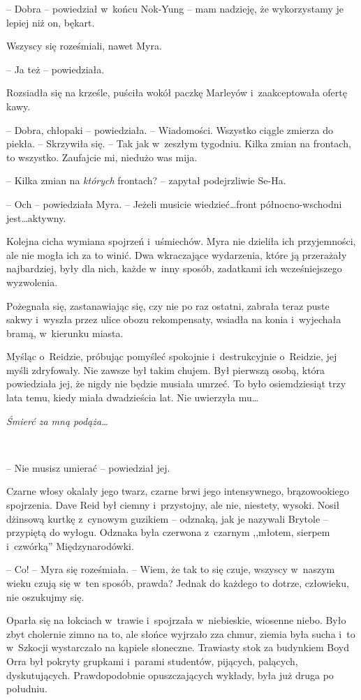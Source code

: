 \documentclass[oneside,polish,11pt,sfheadings]{mwbk}
\begin{document}
-- Dobra -- powiedział w~końcu Nok-Yung -- mam nadzieję, że wykorzystamy je
lepiej niż on, bękart.

Wszyscy się roześmiali, nawet Myra.

-- Ja też -- powiedziała.

Rozsiadła się na krześle, puściła wokół paczkę Marleyów i~zaakceptowała
ofertę kawy.

-- Dobra, chłopaki -- powiedziała. -- Wiadomości. Wszystko ciągle zmierza
do piekła. -- Skrzywiła się. -- Tak jak w~zeszłym tygodniu. Kilka zmian na
frontach, to wszystko. Zaufajcie mi, niedużo was mija.

-- Kilka zmian na \textit{których }frontach? -- zapytał podejrzliwie Se-Ha.

-- Och -- powiedziała Myra. -- Jeżeli musicie wiedzieć\ldots front
północno-wschodni jest\ldots aktywny.

Kolejna cicha wymiana spojrzeń i~uśmiechów. Myra nie dzieliła ich
przyjemności, ale nie mogła ich za to winić. Dwa wkraczające wydarzenia,
które ją przerażały najbardziej, były dla nich, każde w~inny sposób,
zadatkami ich wcześniejszego wyzwolenia.

Pożegnała się, zastanawiając się, czy nie po raz ostatni, zabrała teraz
puste sakwy i~wyszła przez ulice obozu rekompensaty, wsiadła na konia i~wyjechała bramą, w~kierunku miasta.

Myśląc o~Reidzie, próbując pomyśleć spokojnie i~destrukcyjnie o~Reidzie,
jej myśli zdryfowały. Nie zawsze był takim chujem. Był pierwszą osobą,
która powiedziała jej, że nigdy nie będzie musiała umrzeć. To było
osiemdziesiąt trzy lata temu, kiedy miała dwadzieścia lat. Nie uwierzyła
mu\ldots

\textit{Śmierć za mną podąża\ldots}

~

-- Nie musisz umierać -- powiedział jej.

Czarne włosy okalały jego twarz, czarne brwi jego intensywnego,
brązowookiego spojrzenia. Dave Reid był ciemny i~przystojny, ale nie,
niestety, wysoki. Nosił dżinsową kurtkę z~cynowym guzikiem -- odznaką,
jak je nazywali Brytole -- przypiętą do wyłogu. Odznaka była czerwona z~czarnym ,,młotem, sierpem i~czwórką'' Międzynarodówki.

-- Co! -- Myra się roześmiała. -- Wiem, że tak to się czuje, wszyscy w~naszym wieku czują się w~ten sposób, prawda? Jednak do każdego to
dotrze, człowieku, nie oszukujmy się.

Oparła się na łokciach w~trawie i~spojrzała w~niebieskie, wiosenne
niebo. Było zbyt cholernie zimno na to, ale słońce wyjrzało zza chmur,
ziemia była sucha i~to w~Szkocji wystarczało na kąpiele słoneczne.
Trawiasty stok za budynkiem Boyd Orra był pokryty grupkami i~parami
studentów, pijących, palących, dyskutujących. Prawdopodobnie
opuszczających wykłady, była już druga po południu.
\end{document}
